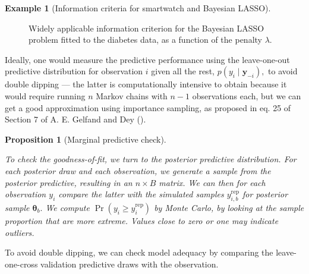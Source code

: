 \documentclass[
  11pt,
  letterpaper,
]{scrbook}
\theoremstyle{definition}
\theoremstyle{plain}
\theoremstyle{plain}
\theoremstyle{plain}
\newtheorem{proposition}{Proposition}[chapter]
\theoremstyle{definition}
\newtheorem{example}{Example}[chapter]
\theoremstyle{definition}
\theoremstyle{remark}
\begin{document}
\begin{example}[Information criteria for smartwatch and Bayesian
LASSO]
\begin{figure}[ht!]
{}

\caption{\label{fig-waic-blasso}Widely applicable information criterion
for the Bayesian LASSO problem fitted to the diabetes data, as a
function of the penalty \(\lambda.\)}

\end{figure}%

\end{example}

Ideally, one would measure the predictive performance using the
leave-one-out predictive distribution for observation \(i\) given all
the rest, \(p(y_i \mid \boldsymbol{y}_{-i}),\) to avoid double dipping
--- the latter is computationally intensive to obtain because it would
require running \(n\) Markov chains with \(n-1\) observations each, but
we can get a good approximation using importance sampling, as proposed
in eq. 25 of Section 7 of A. E. Gelfand and Dey
().

\begin{proposition}[Marginal predictive
check]\protect\hypertarget{prp-marginal-pred-checks}{}\label{prp-marginal-pred-checks}

To check the goodness-of-fit, we turn to the posterior predictive
distribution. For each posterior draw and each observation, we generate
a sample from the posterior predictive, resulting in an \(n \times B\)
matrix. We can then for each observation \(y_i\) compare the latter with
the simulated samples \(y_{i,b}^{\mathrm{rep}}\) for posterior sample
\(\boldsymbol{\theta}_b.\) We compute
\(\Pr(y_i \geq y_{i}^{\mathrm{rep}})\) by Monte Carlo, by looking at the
sample proportion that are more extreme. Values close to zero or one may
indicate outliers.

\end{proposition}

To avoid double dipping, we can check model adequacy by comparing the
leave-one-cross validation predictive draws with the observation.
\end{document}
